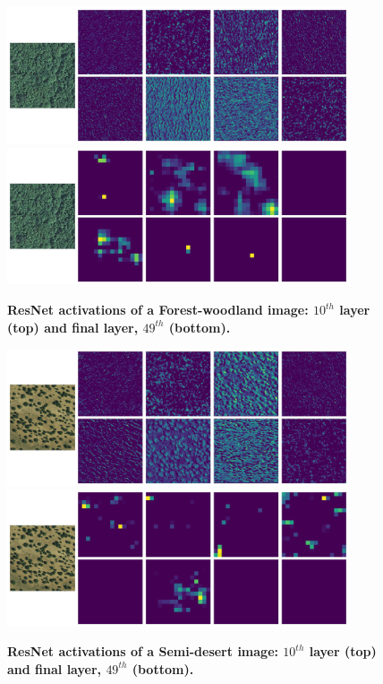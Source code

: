 \begin{figure}[h!]
	\centering
	\includegraphics[width=0.9\textwidth]{Figures/activations/forest-woodland_l0_s1_activation_10.png}
	\includegraphics[width=0.9\textwidth]{Figures/activations/forest-woodland_l0_s1_activation_49.png}
	\captionsetup{width=1\linewidth}
	\caption{\textbf{ResNet activations of a Forest-woodland image: $10^{th}$ layer (top) and final layer, $49^{th}$ (bottom).}}
	\label{fig:act_forest_woodland}
\end{figure}

\begin{figure}[h!]
	\centering
	\includegraphics[width=0.9\textwidth]{Figures/activations/semi-desert_l0_s1_activation_10.png}
	\includegraphics[width=0.9\textwidth]{Figures/activations/semi-desert_l0_s1_activation_49.png}
	\captionsetup{width=1\linewidth}
	\caption{\textbf{ResNet activations of a Semi-desert image: $10^{th}$ layer (top) and final layer, $49^{th}$ (bottom).}}
	\label{fig:act_semi_desert}
\end{figure}

